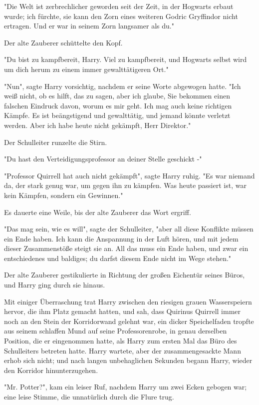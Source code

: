 {"Die Welt ist zerbrechlicher geworden seit der Zeit, in der Hogwarts erbaut wurde; ich fürchte, sie kann den Zorn eines weiteren Godric Gryffindor nicht ertragen. Und er war in seinem Zorn langsamer als du."

Der alte Zauberer schüttelte den Kopf.

"Du bist zu kampfbereit, Harry. Viel zu kampfbereit, und Hogwarts selbst wird um dich herum zu einem immer gewalttätigeren Ort."

"Nun", sagte Harry vorsichtig, nachdem er seine Worte abgewogen hatte. "Ich weiß nicht, ob es hilft, das zu sagen, aber ich glaube, Sie bekommen einen falschen Eindruck davon, worum es mir geht. Ich mag auch keine richtigen Kämpfe. Es ist beängstigend und gewalttätig, und jemand könnte verletzt werden. Aber ich habe heute nicht gekämpft, Herr Direktor."

Der Schulleiter runzelte die Stirn.

"Du hast den Verteidigungsprofessor an deiner Stelle geschickt -"

"Professor Quirrell hat auch nicht gekämpft", sagte Harry ruhig. "Es war niemand da, der stark genug war, um gegen ihn zu kämpfen. Was heute passiert ist, war kein Kämpfen, sondern ein Gewinnen."

Es dauerte eine Weile, bis der alte Zauberer das Wort ergriff.

"Das mag sein, wie es will", sagte der Schulleiter, "aber all diese Konflikte müssen ein Ende haben. Ich kann die Anspannung in der Luft hören, und mit jedem dieser Zusammenstöße steigt sie an. All das muss ein Ende haben, und zwar ein entschiedenes und baldiges; du darfst diesem Ende nicht im Wege stehen."

Der alte Zauberer gestikulierte in Richtung der großen Eichentür seines Büros, und Harry ging durch sie hinaus.

Mit einiger Überraschung trat Harry zwischen den riesigen grauen Wasserspeiern hervor, die ihm Platz gemacht hatten, und sah, dass Quirinus Quirrell immer noch an den Stein der Korridorwand gelehnt war, ein dicker Speichelfaden tropfte aus seinem schlaffen Mund auf seine Professorenrobe, in genau derselben Position, die er eingenommen hatte, als Harry zum ersten Mal das Büro des Schulleiters betreten hatte. Harry wartete, aber der zusammengesackte Mann erhob sich nicht; und nach langen unbehaglichen Sekunden begann Harry, wieder den Korridor hinunterzugehen.

"Mr. Potter?", kam ein leiser Ruf, nachdem Harry um zwei Ecken gebogen war; eine leise Stimme, die unnatürlich durch die Flure trug.

}
